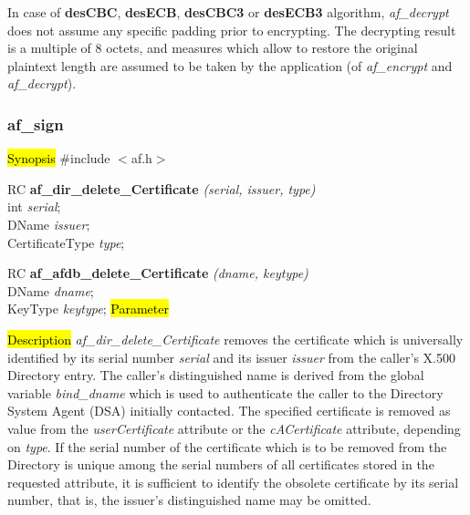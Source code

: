    In case of {\bf desCBC}, {\bf desECB}, {\bf desCBC3} or {\bf desECB3} algorithm, {\em af\_decrypt} does
   not assume any specific padding prior to encrypting. The decrypting result is a multiple
   of 8 octets, and measures which allow to restore the original plaintext length are 
   assumed to be taken by the application (of {\em af\_encrypt} and {\em af\_decrypt}).

\subsubsection{af\_sign}
\hl{Synopsis}
\#include $<$af.h$>$ 

RC {\bf af\_dir\_delete\_Certificate} {\em (serial, issuer, type)} \\
int {\em serial}; \\
DName {\em *issuer}; \\
CertificateType {\em type}; 

RC {\bf af\_afdb\_delete\_Certificate} {\em (dname, keytype)} \\
DName {\em *dname}; \\
KeyType {\em keytype};
\hl{Parameter}





\hl{Description}
{\em af\_dir\_delete\_Certificate} removes the certificate which is universally 
identified by its serial number {\em serial} and its issuer {\em issuer} from the 
caller's X.500 Directory entry. The caller's distinguished name is derived from
the global variable {\em bind\_dname} which is used to authenticate the caller to the
Directory System Agent (DSA) initially contacted.
The specified certificate is removed as value from the
{\em userCertificate} attribute or the {\em cACertificate} attribute, depending
on {\em type}.
If the serial number of the certificate which is to be removed from the Directory 
is unique among the serial numbers of all certificates stored in the requested attribute, 
it is sufficient to identify the obsolete certificate by its serial number, that is, 
the issuer's distinguished name may be omitted.

